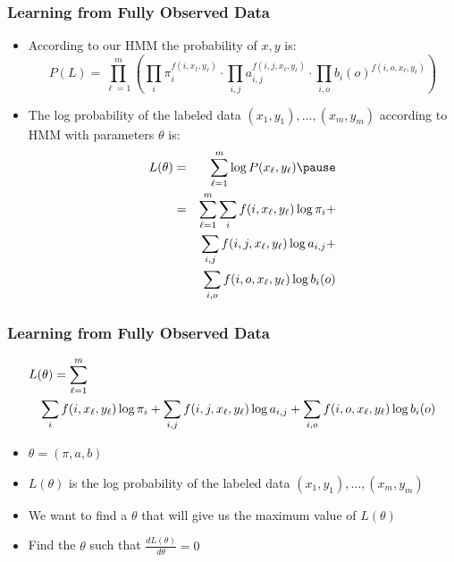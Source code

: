 \begin{frame}
\frametitle{Learning from Fully Observed Data}
\begin{itemize}[<+->]
\item According to our HMM the probability of $x,y$ is:
\[ P(L) = \prod_{\ell=1}^m \left( \prod_{i} \pi_i^{f(i,x_\ell,y_\ell)} \cdot \prod_{i,j} a_{i,j}^{f(i,j,x_\ell,y_\ell)} \cdot \prod_{i,o} b_i(o)^{f(i,o,x_\ell,y_\ell)} \right) \]
\item The log probability of the labeled data $(x_1, y_1), \ldots, (x_m, y_m)$ according to HMM with parameters $\theta$ is:
\begin{eqnarray*}
L(\theta) & = & \sum_{\ell=1}^m \log P(x_\ell, y_\ell) \pause \\
& = & \sum_{\ell=1}^m  \sum_{i} f(i,x_\ell,y_\ell) \log \pi_i + \\
&& \sum_{i,j} f(i,j,x_\ell,y_\ell) \log a_{i,j} + \\
&& \sum_{i,o} f(i,o,x_\ell,y_\ell) \log b_i(o) 
\end{eqnarray*}
\end{itemize}
\end{frame}

\begin{frame}
\frametitle{Learning from Fully Observed Data}
{\small\begin{eqnarray*}
\lefteqn{L(\theta) = \sum_{\ell=1}^m  } \\
&& \sum_{i} f(i,x_\ell,y_\ell) \log \pi_i + \sum_{i,j} f(i,j,x_\ell,y_\ell) \log a_{i,j} + \sum_{i,o} f(i,o,x_\ell,y_\ell) \log b_i(o) \end{eqnarray*}}
\begin{itemize}[<+->]
\item $\theta = \left( \pi, a, b \right)$
\item $L(\theta)$ is the log probability of the labeled data $(x_1, y_1), \ldots, (x_m, y_m)$ 
\item We want to find a $\theta$ that will give us the maximum value of $L(\theta)$
\item Find the $\theta$ such that $\frac{d L(\theta)}{d \theta} = 0$ 
\end{itemize}
\end{frame}

